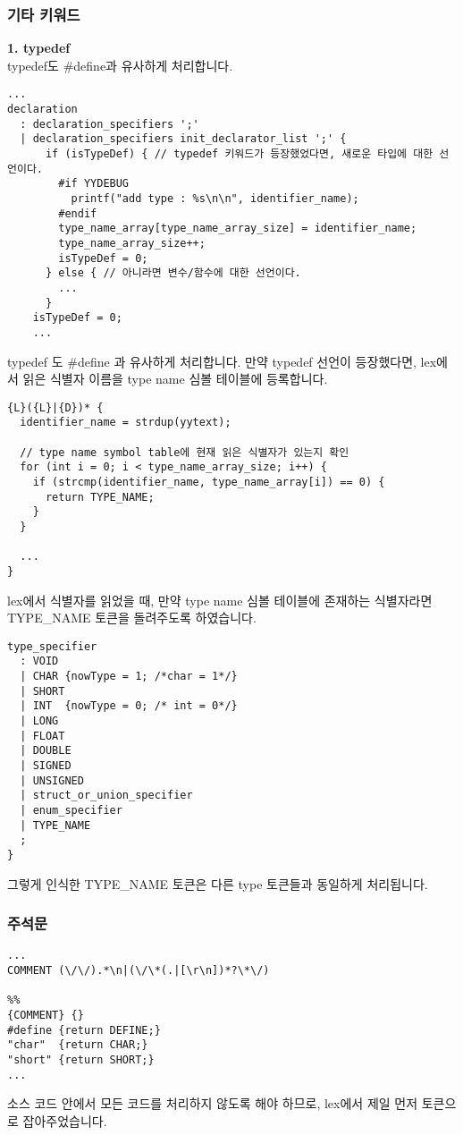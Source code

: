 \documentclass{article}
\begin{document}
\subsubsection{기타 키워드}
\textbf{1. typedef}\\
\quad typedef도 \#define과 유사하게 처리합니다.\\
\begin{verbatim}
...
declaration
  : declaration_specifiers ';'
  | declaration_specifiers init_declarator_list ';' {
      if (isTypeDef) { // typedef 키워드가 등장했었다면, 새로운 타입에 대한 선언이다.
        #if YYDEBUG
          printf("add type : %s\n\n", identifier_name);
        #endif
        type_name_array[type_name_array_size] = identifier_name;
        type_name_array_size++;
        isTypeDef = 0;
      } else { // 아니라면 변수/함수에 대한 선언이다.
        ...
      }
    isTypeDef = 0;
    ...
\end{verbatim}
\quad typedef 도 \#define 과 유사하게 처리합니다.
만약 typedef 선언이 등장했다면, lex에서 읽은 식별자 이름을 type name 심볼 테이블에 등록합니다.

\begin{verbatim}
{L}({L}|{D})* {
  identifier_name = strdup(yytext);

  // type name symbol table에 현재 읽은 식별자가 있는지 확인
  for (int i = 0; i < type_name_array_size; i++) {
    if (strcmp(identifier_name, type_name_array[i]) == 0) {
      return TYPE_NAME;
    }
  }

  ...
}
\end{verbatim}
\quad lex에서 식별자를 읽었을 때, 만약 type name 심볼 테이블에 존재하는 식별자라면 TYPE\_NAME 토큰을 돌려주도록 하였습니다.

\begin{verbatim}
type_specifier
  : VOID
  | CHAR {nowType = 1; /*char = 1*/}
  | SHORT
  | INT  {nowType = 0; /* int = 0*/}
  | LONG
  | FLOAT
  | DOUBLE
  | SIGNED
  | UNSIGNED
  | struct_or_union_specifier
  | enum_specifier
  | TYPE_NAME
  ;
}
\end{verbatim}
그렇게 인식한 TYPE\_NAME 토큰은 다른 type 토큰들과 동일하게 처리됩니다.

\subsubsection{주석문}
\begin{verbatim}
...
COMMENT (\/\/).*\n|(\/\*(.|[\r\n])*?\*\/)

%%
{COMMENT} {}
#define {return DEFINE;}
"char"  {return CHAR;}
"short" {return SHORT;}
...
\end{verbatim}
 소스 코드 안에서 모든 코드를 처리하지 않도록 해야 하므로, lex에서 제일 먼저 토큰으로 잡아주었습니다.
\end{document}
